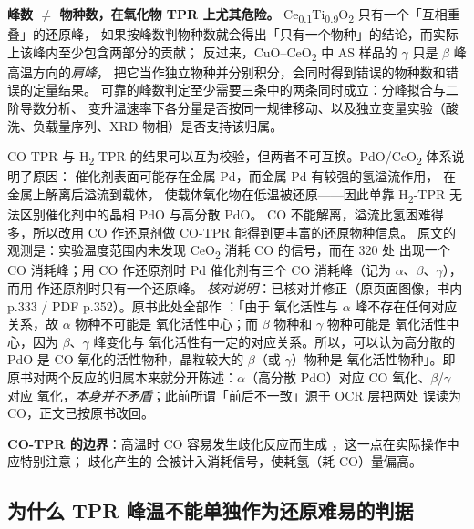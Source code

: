 \begin{pitfall}
\textbf{峰数 $\ne$ 物种数，在氧化物 TPR 上尤其危险。}
Ce\textsubscript{0.1}Ti\textsubscript{0.9}O\textsubscript{2} 只有一个「互相重叠」的还原峰，
如果按峰数判物种数就会得出「只有一个物种」的结论，而实际上该峰内至少包含两部分的贡献；
反过来，CuO--CeO\textsubscript{2} 中 AS 样品的 $\gamma$ 只是 $\beta$ 峰高温方向的\emph{肩峰}，
把它当作独立物种并分别积分，会同时得到错误的物种数和错误的定量结果。
可靠的峰数判定至少需要三条中的两条同时成立：分峰拟合与二阶导数分析、
变升温速率下各分量是否按同一规律移动、以及独立变量实验（酸洗、负载量序列、XRD 物相）是否支持该归属。
\end{pitfall}

\begin{crosscheck}
CO-TPR 与 H\textsubscript{2}-TPR 的结果可以互为校验，但两者不可互换。PdO/CeO\textsubscript{2} 体系说明了原因：
催化剂表面可能存在金属 Pd，而金属 Pd 有较强的氢溢流作用， 在金属上解离后溢流到载体，
使载体氧化物在低温被还原——因此单靠 H\textsubscript{2}-TPR 无法区别催化剂中的晶相 PdO 与高分散 PdO。
CO 不能解离，溢流比氢困难得多，所以改用 CO 作还原剂做 CO-TPR 能得到更丰富的还原物种信息。
原文的观测是：实验温度范围内未发现 CeO\textsubscript{2} 消耗 CO 的信号，而在 \qty{320}{\degC} 处
出现一个 CO 消耗峰；用 CO 作还原剂时 Pd 催化剂有三个 CO 消耗峰（记为 $\alpha$、$\beta$、$\gamma$），
而用  作还原剂时只有一个还原峰。
\emph{核对说明}：已核对并修正（原页面图像，书内 p.333 / PDF p.352）。原书此处全部作 ：「由于  氧化活性与 $\alpha$ 峰不存在任何对应关系，故 $\alpha$ 物种不可能是  氧化活性中心；而 $\beta$ 物种和 $\gamma$ 物种可能是  氧化活性中心，因为 $\beta$、$\gamma$ 峰变化与  氧化活性有一定的对应关系。所以，可以认为高分散的 PdO 是 CO 氧化的活性物种，晶粒较大的 $\beta$（或 $\gamma$）物种是  氧化活性物种」。即原书对两个反应的归属本来就分开陈述：$\alpha$（高分散 PdO）对应 CO 氧化、$\beta$/$\gamma$ 对应  氧化，\emph{本身并不矛盾}；此前所谓「前后不一致」源于 OCR 层把两处  误读为 CO，正文已按原书改回。

\textbf{CO-TPR 的边界}：高温时 CO 容易发生歧化反应而生成 ，这一点在实际操作中应特别注意；
歧化产生的  会被计入消耗信号，使耗氢（耗 CO）量偏高。
\end{crosscheck}

\subsection{为什么 TPR 峰温不能单独作为还原难易的判据}
\label{sec:ch05b-tpr-limit}

